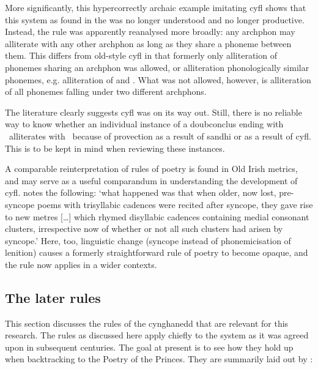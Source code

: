
More significantly, this hypercorrectly archaic example imitating \gls{cyfl} shows that this system as found in the  was no longer understood and no longer productive. Instead, the rule was apparently reanalysed more broadly: any \gls{archphon} may alliterate with any other \gls{archphon} as long as they share a phoneme between them. This differs from old-style \gls{cyfl} in that formerly only alliteration of phonemes sharing an \gls{archphon} was allowed, or alliteration phonologically similar phonemes, e.g. alliteration of  and . What was not allowed, however, is alliteration of all phonemes falling under two different \gls{archphon}s.

The literature clearly suggests \gls{cyfl} was on its way out. Still, there is no reliable way to know whether an individual instance of a \gls{doubconclus} ending with \lT\ alliterates with \xT\ because of provection as a result of sandhi or as a result of \gls{cyfl}. This is to be kept in mind when reviewing these instances.

A comparable reinterpretation of rules of poetry is found in Old Irish metrics, and may serve as a useful comparandum in understanding the development of \gls{cyfl}. \textcite[173]{sims-williams_dating_2016} notes the following: `what happened was that when older, now lost, pre-syncope poems with trisyllabic cadences were recited after syncope, they gave rise to new metres [\dots] which rhymed disyllabic cadences containing medial consonant clusters, irrespective now of whether or not all such clusters had arisen by syncope.' Here, too, linguistic change (syncope instead of phonemicisation of lenition) causes a formerly straightforward rule of poetry to become opaque, and the rule now applies in a wider contexts.




\subsection{The later rules}
\label{rules}
This section discusses the rules of the cynghanedd that are relevant for this research. The rules as discussed here apply chiefly to the system as it was agreed upon in subsequent centuries. The goal at present is to see how they hold up when backtracking to the Poetry of the Princes.
They are summarily laid out by \textcite{roberts_anghenion_1973}:

